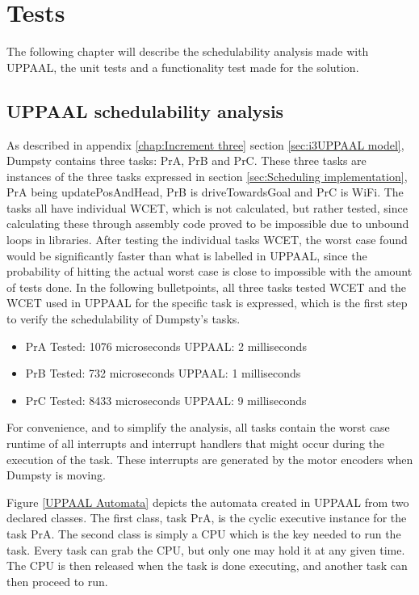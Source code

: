 \chapter{Tests}
\label{chap:Tests}
The following chapter will describe the schedulability analysis made with UPPAAL, the unit tests and a functionality test made for the solution. 

\section{UPPAAL schedulability analysis}
\label{sec:UPPAAL schedulability}
As described in appendix \ref{chap:Increment three} section  \ref{sec:i3UPPAAL model}, Dumpsty contains three tasks: PrA, PrB and PrC. These three tasks are instances of the three tasks expressed in section \ref{sec:Scheduling implementation}, PrA being updatePosAndHead, PrB is driveTowardsGoal and PrC is WiFi.
The tasks all have individual WCET, which is not calculated, but rather tested, since calculating these through assembly code proved to be impossible due to unbound loops in libraries. After testing the individual tasks WCET, the worst case found would be significantly faster than what is labelled in UPPAAL, since the probability of hitting the actual worst case is close to impossible with the amount of tests done. In the following bulletpoints, all three tasks tested WCET and the WCET used in UPPAAL for the specific task is expressed, which is the first step to verify the schedulability of Dumpsty's tasks.


\begin{itemize}
	\item PrA \tab Tested: 1076 microseconds \tab UPPAAL: 2 milliseconds
	\item PrB \tab Tested: 732  microseconds \tab UPPAAL: 1 milliseconds
	\item PrC \tab	Tested: 8433 microseconds \tab UPPAAL: 9 milliseconds
\end{itemize}


For convenience, and to simplify the analysis, all tasks contain the worst case runtime of all interrupts and interrupt handlers that might occur during the execution of the task. These interrupts are generated by the motor encoders when Dumpsty is moving.


Figure \ref{UPPAAL Automata} depicts the automata created in UPPAAL from two declared classes. The first class, task PrA, is the cyclic executive instance for the task PrA. The second class is simply a CPU which is the key needed to run the task. Every task can grab the CPU, but only one may hold it at any given time. The CPU is then released when the task is done executing, and another task can then proceed to run.


